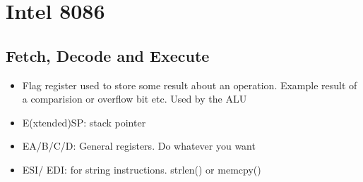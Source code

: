 \documentclass[11pt,letterpaper]{article}
\begin{document}
\maketitle
\thispagestyle{first}
\section*{Intel 8086}
\subsection{Fetch, Decode and Execute}


\begin{itemize}
	\item Flag register used to store some result about an operation. Example
		result of a comparision or overflow bit etc. Used by the ALU
	\item E(xtended)SP: stack pointer
	\item EA/B/C/D: General registers. Do whatever you want
	\item ESI/ EDI: for string instructions. strlen() or memcpy()
\end{itemize}
\end{document}
